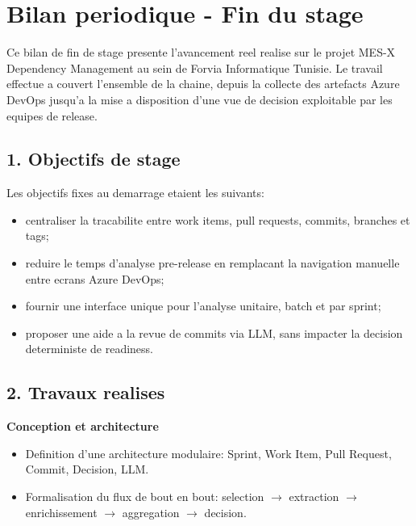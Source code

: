 \chapter*{Bilan periodique - Fin du stage}

Ce bilan de fin de stage presente l'avancement reel realise sur le projet
MES-X Dependency Management au sein de Forvia Informatique Tunisie. Le travail
effectue a couvert l'ensemble de la chaine, depuis la collecte des artefacts
Azure DevOps jusqu'a la mise a disposition d'une vue de decision exploitable par
les equipes de release.

\section*{1. Objectifs de stage}

Les objectifs fixes au demarrage etaient les suivants:

\begin{itemize}
  \item centraliser la tracabilite entre work items, pull requests, commits,
  branches et tags;
  \item reduire le temps d'analyse pre-release en remplacant la navigation
  manuelle entre ecrans Azure DevOps;
  \item fournir une interface unique pour l'analyse unitaire, batch et par
  sprint;
  \item proposer une aide a la revue de commits via LLM, sans impacter la
  decision deterministe de readiness.
\end{itemize}

\section*{2. Travaux realises}

\textbf{Conception et architecture}
\begin{itemize}
  \item Definition d'une architecture modulaire: Sprint, Work Item, Pull
  Request, Commit, Decision, LLM.
  \item Formalisation du flux de bout en bout: selection $\rightarrow$
  extraction $\rightarrow$ enrichissement $\rightarrow$ aggregation
  $\rightarrow$ decision.
\end{itemize}

